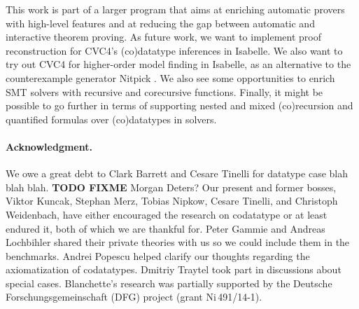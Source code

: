 This work is part of a larger program that aims at enriching automatic provers
with high-level features and at reducing the gap between automatic and
interactive theorem proving. As future work, we want to implement proof
reconstruction for CVC4's (co)datatype inferences in Isabelle. We also want to
try out CVC4 for higher-order model finding in Isabelle, as an alternative to
the counterexample generator Nitpick \cite{blanchette-nipkow-2010}. We also
see some opportunities to enrich SMT solvers with recursive and corecursive
functions. Finally, it might be possible to go further in terms of supporting
nested and mixed (co)recursion and quantified formulas over (co)datatypes in
solvers.

\def\ackname{Acknowledgment}
\paragraph{\ackname.}
We owe a great debt to Clark Barrett and Cesare Tinelli for datatype case blah
blah blah. \textbf{TODO FIXME}
Morgan Deters?
%
Our present and former bosses, Viktor Kuncak, Stephan Merz, Tobias Nipkow,
Cesare Tinelli, and Christoph Weidenbach, have either encouraged the research on
codatatype or at least endured
it, both of which we are thankful for.
%
Peter Gammie and Andreas Lochbihler shared their private
theories with us so we could include them in the benchmarks.
Andrei Popescu helped clarify our thoughts regarding the axiomatization of
codatatypes. Dmitriy Traytel took part in discussions about special
cases.
%
Blanchette's research was partially supported by the Deutsche
Forschungs\-gemein\-schaft (DFG) project
 (grant Ni\,491\slash 14-1).


{}


